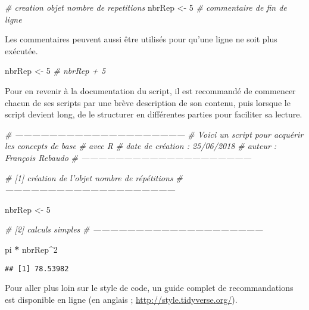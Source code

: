 \documentclass[]{book}
\newenvironment{Shaded}{\begin{snugshade}}{\end{snugshade}}
\newcommand{\DecValTok}[1]{\textcolor[rgb]{0.00,0.00,0.81}{#1}}
\newcommand{\StringTok}[1]{\textcolor[rgb]{0.31,0.60,0.02}{#1}}
\newcommand{\CommentTok}[1]{\textcolor[rgb]{0.56,0.35,0.01}{\textit{#1}}}
\newcommand{\OperatorTok}[1]{\textcolor[rgb]{0.81,0.36,0.00}{\textbf{#1}}}
\newcommand{\NormalTok}[1]{#1}
\theoremstyle{definition}
\theoremstyle{definition}
\theoremstyle{definition}
\theoremstyle{remark}
\begin{document}
\begin{Shaded}
\begin{Highlighting}[]
\CommentTok{# creation objet nombre de repetitions}
\NormalTok{nbrRep <-}\StringTok{ }\DecValTok{5} \CommentTok{# commentaire de fin de ligne}
\end{Highlighting}
\end{Shaded}

Les commentaires peuvent aussi être utilisés pour qu'une ligne ne soit
plus exécutée.

\begin{Shaded}
\begin{Highlighting}[]
\NormalTok{nbrRep <-}\StringTok{ }\DecValTok{5}
\CommentTok{# nbrRep + 5}
\end{Highlighting}
\end{Shaded}

Pour en revenir à la documentation du script, il est recommandé de
commencer chacun de ses scripts par une brève description de son
contenu, puis lorsque le script devient long, de le structurer en
différentes parties pour faciliter sa lecture.

\begin{Shaded}
\begin{Highlighting}[]
\CommentTok{# ------------------------------------------------------------}
\CommentTok{# Voici un script pour acquérir les concepts de base }
\CommentTok{# avec R}
\CommentTok{# date de création : 25/06/2018}
\CommentTok{# auteur : François Rebaudo}
\CommentTok{# ------------------------------------------------------------}

\CommentTok{# [1] création de l'objet nombre de répétitions}
\CommentTok{# ------------------------------------------------------------}

\NormalTok{nbrRep <-}\StringTok{ }\DecValTok{5}

\CommentTok{# [2] calculs simples}
\CommentTok{# ------------------------------------------------------------}

\NormalTok{pi }\OperatorTok{*}\StringTok{ }\NormalTok{nbrRep}\OperatorTok{^}\DecValTok{2}
\end{Highlighting}
\end{Shaded}

\begin{verbatim}
## [1] 78.53982
\end{verbatim}

Pour aller plus loin sur le style de code, un guide complet de
recommandations est disponible en ligne (en anglais ;
\url{http://style.tidyverse.org/}).
\end{document}

